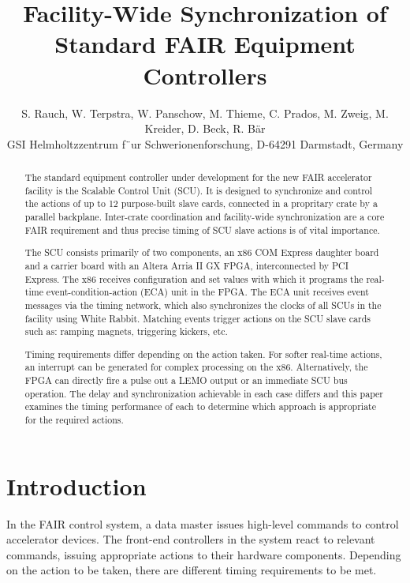 \documentclass{JAC2003}
\begin{document}
\title{Facility-Wide Synchronization of Standard FAIR Equipment Controllers}

\author{
S. Rauch,
W. Terpstra,
W. Panschow,
M. Thieme,
C. Prados,
M. Zweig,
M. Kreider,
D. Beck,
R. B\"ar\\
GSI Helmholtzzentrum f¨ur Schwerionenforschung, D-64291 Darmstadt, Germany}

\maketitle

\begin{abstract}
The standard equipment controller under development for the new FAIR
accelerator facility is the Scalable Control Unit (SCU). It is designed to
synchronize and control the actions of up to 12 purpose-built slave cards,
connected in a propritary crate by a parallel backplane. Inter-crate
coordination and facility-wide synchronization are a core FAIR requirement
and thus precise timing of SCU slave actions is of vital importance.

The SCU consists primarily of two components, an x86 COM Express daughter
board and a carrier board with an Altera Arria II GX FPGA, interconnected by
PCI Express. The x86 receives configuration and set values with which it
programs the real-time event-condition-action (ECA) unit in the FPGA. The
ECA unit receives event messages via the timing network, which also
synchronizes the clocks of all SCUs in the facility using White Rabbit.
Matching events trigger actions on the SCU slave cards such as: ramping
magnets, triggering kickers, etc.

Timing requirements differ depending on the action taken. For softer
real-time actions, an interrupt can be generated for complex processing on
the x86. Alternatively, the FPGA can directly fire a pulse out a LEMO output
or an immediate SCU bus operation. The delay and synchronization achievable
in each case differs and this paper examines the timing performance of each
to determine which approach is appropriate for the required actions.
\end{abstract}

\section{Introduction}
In the FAIR control system,
a data master issues high-level commands to control accelerator devices.
The front-end controllers in the system react to relevant commands,
issuing appropriate actions to their hardware components.
Depending on the action to be taken,
there are different timing requirements to be met.
\end{document}
